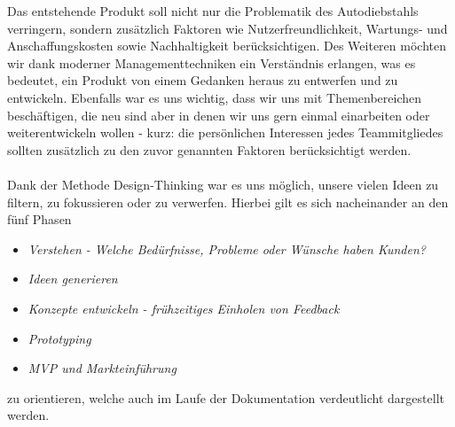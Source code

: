 Das entstehende Produkt soll nicht nur die Problematik des Autodiebstahls verringern, sondern zusätzlich Faktoren wie Nutzerfreundlichkeit, Wartungs- und Anschaffungskosten sowie Nachhaltigkeit berücksichtigen. Des Weiteren möchten wir dank moderner Managementtechniken ein Verständnis erlangen, was es bedeutet, ein Produkt von einem Gedanken heraus zu entwerfen und zu entwickeln. Ebenfalls war es uns wichtig, dass wir uns mit Themenbereichen beschäftigen, die neu sind aber in denen wir uns gern einmal einarbeiten oder weiterentwickeln wollen - kurz: die persönlichen Interessen jedes Teammitgliedes sollten zusätzlich zu den zuvor genannten Faktoren berücksichtigt werden.
\\
\\
Dank der Methode Design-Thinking war es uns möglich, unsere vielen Ideen zu filtern, zu fokussieren oder zu verwerfen. Hierbei gilt es sich nacheinander an den fünf Phasen
\begin{itemize}
	\item \textit{Verstehen - Welche Bedürfnisse, Probleme oder Wünsche haben Kunden?}
	\item \textit{Ideen generieren }
	\item \textit{Konzepte entwickeln - frühzeitiges Einholen von Feedback}
	\item \textit{Prototyping}
	\item \textit{MVP und Markteinführung}
\end{itemize}
zu orientieren, welche auch im Laufe der Dokumentation verdeutlicht dargestellt werden. \cite{Full2022}




